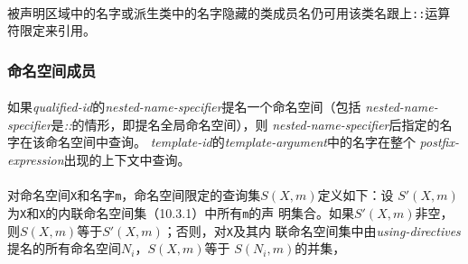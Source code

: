 \paragraph{}
被声明区域中的名字或派生类中的名字隐藏的类成员名仍可用该类名跟上\texttt{::}运算
符限定来引用。

\subsubsection{命名空间成员}
\paragraph{}
如果\textit{qualified-id}的\textit{nested-name-specifier}提名一个命名空间（包括
\textit{nested-name-specifier}是\textit{::}的情形，即提名全局命名空间），则
\textit{nested-name-specifier}后指定的名字在该命名空间中查询。
\textit{template-id}的\textit{template-argument}中的名字在整个
\textit{postfix-expression}出现的上下文中查询。

\paragraph{}
对命名空间\texttt{X}和名字\texttt{m}，命名空间限定的查询集$S(X, m)$定义如下：设
$S'(X, m)$为\texttt{X}和\texttt{X}的内联命名空间集（10.3.1）中所有\texttt{m}的声
明集合。如果$S'(X, m)$非空，则$S(X, m)$等于$S'(X, m)$；否则，对\texttt{X}及其内
联命名空间集中由\textit{using-directives}提名的所有命名空间$N_i$，$S(X, m)$等于
$S(N_i, m)$的并集，

